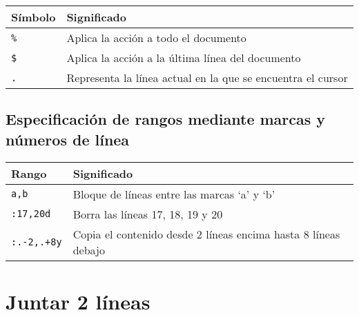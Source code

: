 \documentclass[
  doc,
  floatsintext,
  longtable,
  a4paper,
  nolmodern,
  notxfonts,
  notimes,
  colorlinks=true,linkcolor=blue,citecolor=blue,urlcolor=blue]{apa7}
\begin{document}
\begin{longtable}[]{@{}
  >{\raggedright\arraybackslash}p{}
  >{\raggedright\arraybackslash}p{}@{}}
\toprule\noalign{}
\begin{minipage}[b]{\linewidth}\raggedright
Símbolo
\end{minipage} & \begin{minipage}[b]{\linewidth}\raggedright
Significado
\end{minipage} \\
\midrule\noalign{}
\endhead
\bottomrule\noalign{}
\endlastfoot
\texttt{\%} & Aplica la acción a todo el documento \\
\texttt{\$} & Aplica la acción a la última línea del documento \\
\texttt{.} & Representa la línea actual en la que se encuentra el
cursor \\
\end{longtable}

\subsection{Especificación de rangos mediante marcas y números de
línea}\label{especificaciuxf3n-de-rangos-mediante-marcas-y-nuxfameros-de-luxednea}

\begin{longtable}[]{@{}
  >{\raggedright\arraybackslash}p{}
  >{\raggedright\arraybackslash}p{}@{}}
\toprule\noalign{}
\begin{minipage}[b]{\linewidth}\raggedright
Rango
\end{minipage} & \begin{minipage}[b]{\linewidth}\raggedright
Significado
\end{minipage} \\
\midrule\noalign{}
\endhead
\bottomrule\noalign{}
\endlastfoot
\texttt{\textquotesingle{}a,\textquotesingle{}b} & Bloque de líneas
entre las marcas `a' y `b' \\
\texttt{:17,20d} & Borra las líneas 17, 18, 19 y 20 \\
\texttt{:.-2,.+8y} & Copia el contenido desde 2 líneas encima hasta 8
líneas debajo \\
\end{longtable}

\section{Juntar 2 líneas}\label{juntar-2-luxedneas}
\end{document}
